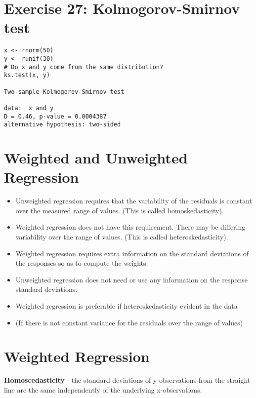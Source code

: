 
\section*{Exercise 27: Kolmogorov-Smirnov test}

\begin{verbatim}
x <- rnorm(50)
y <- runif(30)
# Do x and y come from the same distribution?
ks.test(x, y)

Two-sample Kolmogorov-Smirnov test

data:  x and y
D = 0.46, p-value = 0.0004387
alternative hypothesis: two-sided
\end{verbatim}

\section{Weighted and Unweighted Regression}
\begin{itemize}
	\item Unweighted regression requires that the variability of the
	residuals is constant over the measured range of values.
	(This is called homoskedasticity).
	
	\item Weighted regression does not have this requirement.
	There may be differing variability over the range of values.
	(This is called heteroskedasticity).
	
	\item Weighted regression requires extra information on the standard deviations of the responses so as to compute the weights.
	
	\item Unweighted regression does not need or use any information on the response standard deviations.
	
	\item Weighted regression is preferable if heteroskedasticity evident in the data
	
	\item (If there is not constant variance for the residuals over the range of values)
	
\end{itemize}


\section{Weighted Regression}

\textbf{Homoscedasticity} - the standard deviations of
y-observations from the straight line are the same independently
of the underlying x-observations.

